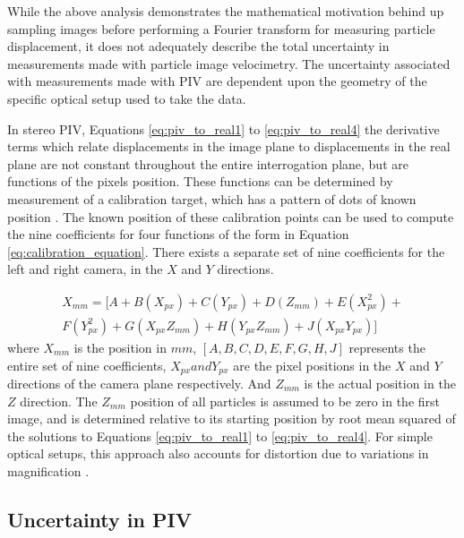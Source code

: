 

While the above analysis demonstrates the mathematical motivation behind up 
sampling images before performing a Fourier transform for measuring particle 
displacement, it does not adequately describe the total uncertainty in 
measurements made with particle image velocimetry. The uncertainty associated 
with measurements made with PIV are dependent upon the geometry of the specific 
optical setup used to take the data.

In stereo PIV, Equations \ref{eq:piv_to_real1} to \ref{eq:piv_to_real4} the 
derivative terms which relate displacements in the image plane to displacements 
in the real plane are not constant throughout the entire interrogation plane, 
but are functions of the pixels position. These functions can be determined by 
measurement of a calibration target, which has a pattern of dots of known 
position \cite{fouras2007}. The known position of these calibration points can 
be used to compute the nine coefficients for four functions of the form in 
Equation \ref{eq:calibration_equation}. There exists a separate set of nine 
coefficients for the left and right camera, in the $X$ and $Y$ directions.

\begin{equation}
	\begin{multlined}
	X_{mm} =  [A + B(X_{px}) + C(Y_{px}) + D(Z_{mm}) + E(X_{px}^2) + \\
	F(Y_{px}^2) + G(X_{px}Z_{mm}) + H(Y_{px}Z_{mm}) + J(X_{px}Y_{px})]
	\end{multlined}
	\label{eq:calibration_equation}
\end{equation}
\newline
\noindent
where $X_{mm}$ is the position in $mm$, $[A, B, C, D, E, F, G, H, J]$ 
represents the entire set of nine coefficients, $X_{px} and Y_{px}$ are the 
pixel positions in the $X$ and $Y$ directions of the camera plane 
respectively. And $Z_{mm}$ is the actual position in the $Z$ direction. The 
$Z_{mm}$ position of all particles is assumed to be zero in the first image, 
and is determined relative to its starting position by root mean squared of 
the solutions to Equations \ref{eq:piv_to_real1} to \ref{eq:piv_to_real4}.
For simple optical setups, this approach also accounts for distortion due to 
variations in magnification \cite{soloff1997, willert1997}.

\subsection{Uncertainty in PIV}

